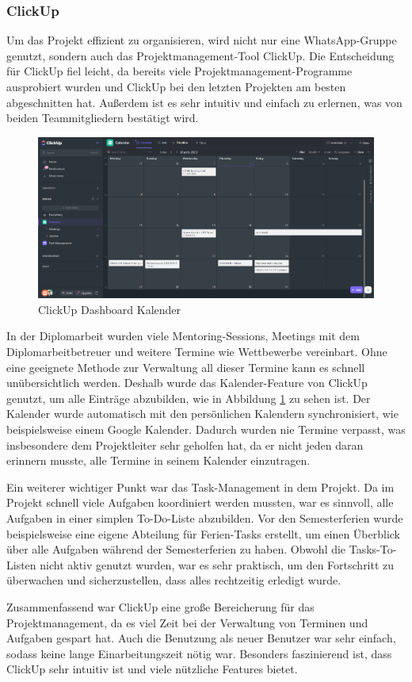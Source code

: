 \subsubsection{ClickUp}
Um das Projekt effizient zu organisieren, wird nicht nur eine WhatsApp-Gruppe genutzt, sondern auch das Projektmanagement-Tool ClickUp. Die Entscheidung für ClickUp fiel leicht, da bereits viele Projektmanagement-Programme ausprobiert wurden und ClickUp bei den letzten Projekten am besten abgeschnitten hat. Außerdem ist es sehr intuitiv und einfach zu erlernen, was von beiden Teammitgliedern bestätigt wird.

\begin{figure}[h]
    \centering
    \includegraphics[width=1\textwidth]{./pics/clickup-calender-view.png}
    \caption{ClickUp Dashboard Kalender}
    \label{fig:clickup-calendar}
\end{figure}


In der Diplomarbeit wurden viele Mentoring-Sessions, Meetings mit dem Diplomarbeitbetreuer und weitere Termine wie Wettbewerbe vereinbart. Ohne eine geeignete Methode zur Verwaltung all dieser Termine kann es schnell unübersichtlich werden. Deshalb wurde das Kalender-Feature von ClickUp genutzt, um alle Einträge abzubilden, wie in Abbildung \ref{fig:clickup-calendar} zu sehen ist. Der Kalender wurde automatisch mit den persönlichen Kalendern synchronisiert, wie beispielsweise einem Google Kalender. Dadurch wurden nie Termine verpasst, was insbesondere dem Projektleiter sehr geholfen hat, da er nicht jeden daran erinnern musste, alle Termine in seinem Kalender einzutragen.

Ein weiterer wichtiger Punkt war das Task-Management in dem Projekt. Da im Projekt schnell viele Aufgaben koordiniert werden mussten, war es sinnvoll, alle Aufgaben in einer simplen To-Do-Liste abzubilden. Vor den Semesterferien wurde beispielsweise eine eigene Abteilung für Ferien-Tasks erstellt, um einen Überblick über alle Aufgaben während der Semesterferien zu haben. Obwohl die Tasks-To-Listen nicht aktiv genutzt wurden, war es sehr praktisch, um den Fortschritt zu überwachen und sicherzustellen, dass alles rechtzeitig erledigt wurde.

Zusammenfassend war ClickUp eine große Bereicherung für das
Projektmanagement, da es viel Zeit bei der Verwaltung von
Terminen und Aufgaben gespart hat. Auch die Benutzung als
neuer Benutzer war sehr einfach, sodass keine lange
Einarbeitungszeit nötig war. Besonders faszinierend ist,
dass ClickUp sehr intuitiv ist und viele nützliche Features
bietet.

